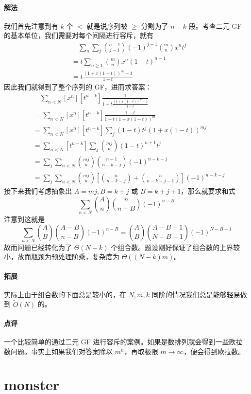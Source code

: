 \documentclass[12pt]{ctexart}
\theoremstyle{theorem}
\theoremstyle{theorem}
\begin{document}
\paragraph{解法} 我们首先注意到有 $k$ 个 $<$ 就是说序列被 $\ge$ 分割为了 $n-k$ 段。考查二元 GF 的基本单位，我们需要对每个间隔进行容斥，就有
\begin{align*}
&\quad \sum_n\sum_j\binom{n-1}{j-1} (-1)^{j-1} \binom m n x^nt^j\\
&= t\sum_{n\ge 1} \binom m n x^n (1-t)^{n-1}\\
&= t\frac{ (1+x(1-t))^m -1 }{1-t}
\end{align*}
因此我们就得到了整个序列的 GF，进而求答案：
\begin{align*}
&\quad \sum_{n<N}[x^n][t^{n-k}]\frac 1{1-t\frac{ (1+x(1-t))^m -1 }{1-t}}\\
&= \sum_{n<N}[x^n][t^{n-k}]\frac{1-t}{1-t(1+x(1-t))^m}\\
&= \sum_{n<N}[x^n][t^{n-k}]\sum_j (1-t)t^j(1+x(1-t))^{mj}\\
&= \sum_{n<N}[t^{n-k}]\sum_j \binom {mj}n (1-t)^{n+1}t^j\\
&= \sum_j \sum_{n<N} \binom {mj}n \binom{n+1}{n-k-j}(-1)^{n-k-j}\\
&= \sum_j \sum_{n<N} \binom {mj}n \left[ \binom n{n-k-j} + \binom n{n-k-j-1} \right](-1)^{n-k-j}
\end{align*}
接下来我们考虑抽象出 $A=mj,B=k+j$ 或 $B=k+j+1$，那么就要求和式
$$
\sum_{n<N} \binom An \binom{n}{n-B}(-1)^{n-B}
$$
注意到这就是
$$
\sum_{n<N} \binom AB \binom{A-B}{n-B}(-1)^{n-B}
=\binom AB \binom{A-B-1}{N-B-1}(-1)^{N-B-1}
$$
故而问题已经转化为了 $\Theta(N-k)$ 个组合数。题设刚好保证了组合数的上界较小，故而瓶颈为预处理阶乘，复杂度为 $\Theta((N-k)m)$。

\paragraph{拓展} 实际上由于组合数的下面总是较小的，在 $N,m,k$ 同阶的情况我们总是能够轻易做到 $\tilde O(N)$ 的。

\paragraph{点评} 一个比较简单的通过二元 GF 进行容斥的案例。如果是数排列就会得到一些欧拉数问题。事实上如果我们对答案除以 $m^n$，再取极限 $m \rightarrow \infty$，便会得到欧拉数。

\newpage

\section{monster}
\end{document}
